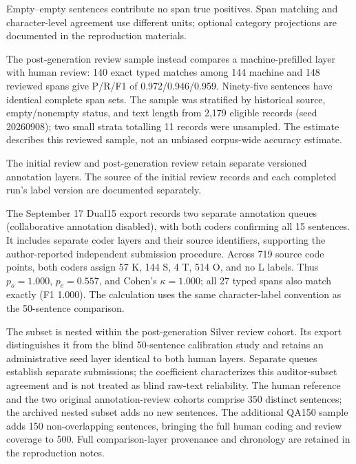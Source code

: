 Empty--empty sentences contribute no span true positives. Span matching and character-level agreement use different units; optional category projections are documented in the reproduction materials.

The post-generation review sample instead compares a machine-prefilled layer with human review: 140 exact typed matches among 144 machine and 148 reviewed spans give P/R/F1 of 0.972/0.946/0.959. Ninety-five sentences have identical complete span sets. The sample was stratified by historical source, empty/nonempty status, and text length from 2,179 eligible records (seed 20260908); two small strata totalling 11 records were unsampled. The estimate describes this reviewed sample, not an unbiased corpus-wide accuracy estimate.

The initial review and post-generation review retain separate versioned annotation layers. The source of the initial review records and each completed run's label version are documented separately.

The September 17 Dual15 export records two separate annotation queues (collaborative annotation disabled), with both coders confirming all 15 sentences. It includes separate coder layers and their source identifiers, supporting the author-reported independent submission procedure. Across 719 source code points, both coders assign 57 K, 144 S, 4 T, 514 O, and no L labels. Thus $p_o=1.000$, $p_e=0.557$, and Cohen's $\kappa=1.000$; all 27 typed spans also match exactly (F1 1.000). The calculation uses the same character-label convention as the 50-sentence comparison.

The subset is nested within the post-generation Silver review cohort. Its export distinguishes it from the blind 50-sentence calibration study and retains an administrative seed layer identical to both human layers. Separate queues establish separate submissions; the coefficient characterizes this auditor-subset agreement and is not treated as blind raw-text reliability. The human reference and the two original annotation-review cohorts comprise 350 distinct sentences; the archived nested subset adds no new sentences. The additional QA150 sample adds 150 non-overlapping sentences, bringing the full human coding and review coverage to 500. Full comparison-layer provenance and chronology are retained in the reproduction notes.


